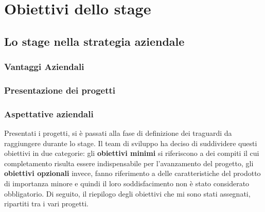 \newpage
\chapter{Obiettivi dello stage}
\label{cap:obiettivi-stage}
\section{Lo stage nella strategia aziendale}
\subsection{Vantaggi Aziendali}
\subsection{Presentazione dei progetti}
\subsection{Aspettative aziendali}

Presentati i progetti, si è passati alla fase di definizione dei traguardi da raggiungere durante lo stage.
Il team di sviluppo ha deciso di suddividere questi obiettivi in due categorie: gli \textbf{obiettivi minimi} si riferiscono a dei compiti il cui completamento risulta essere indispensabile per l'avanzamento del progetto, gli \textbf{obiettivi opzionali} invece, fanno riferimento a delle caratteristiche del prodotto di importanza minore e quindi il loro soddisfacimento non è stato considerato obbligatorio.
Di seguito, il riepilogo degli obiettivi che mi sono stati assegnati, ripartiti tra i vari progetti.

